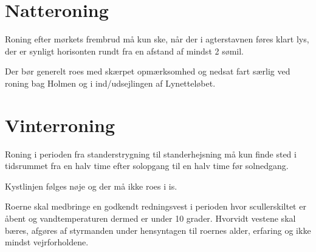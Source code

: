 \documentclass{article}
\begin{document}
\section{Natteroning}

Roning efter mørkets frembrud må kun ske, når der i agterstavnen føres
klart lys, der er synligt horisonten rundt fra en afstand af mindst 2
sømil.

Der bør generelt roes med skærpet opmærksomhed og nedsat fart særlig ved
roning bag Holmen og i ind/udsejlingen af Lynetteløbet.

\section{Vinterroning}
    
Roning i perioden fra standerstrygning til standerhejsning må kun finde
sted i tidsrummet fra en halv time efter solopgang til en halv time før
solnedgang.

Kystlinjen følges nøje og der må ikke roes i is.

Roerne skal medbringe en godkendt redningsvest i perioden hvor
scullerskiltet er åbent og vandtemperaturen dermed er under 10 grader.
Hvorvidt vestene skal bæres, afgøres af styrmanden under hensyntagen til
roernes alder, erfaring og ikke mindst vejrforholdene.
\end{document}
